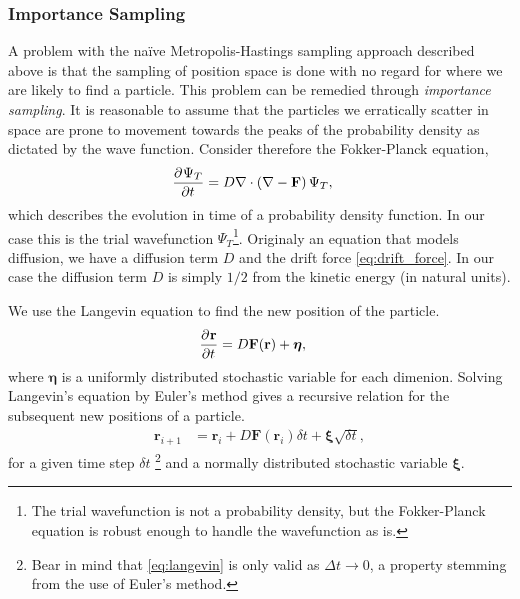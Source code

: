 \documentclass[
    a4paper, aps, twocolumn, floatfix, superscriptaddress,
    nofootinbib]{revtex4-1}
\newcommand{\vf}{\mathbf}
\newcommand{\vfg}{\boldsymbol}
\newcommand{\1}{\mathds{1}}
\begin{document}
        \subsubsection{Importance Sampling}
            A problem with the naïve Metropolis-Hastings sampling approach
            described above is that the sampling of position space is done with
            no regard for where we are likely to find a particle. This problem
            can be remedied through \emph{importance sampling}.  It is
            reasonable to assume that the particles we erratically scatter in
            space are prone to movement towards the peaks of the probability
            density as dictated by the wave function. Consider therefore the
            Fokker-Planck equation,
            \begin{align}
                \dpd[]{\Psi_T}{t}
                &=
                D \nabla\cdot
                \left(
                    \nabla
                    - \vf{F}
                \right) \Psi_T,
                \label{eq:fokker_planck}
            \end{align}
            which describes the evolution in time of a probability density
            function. In our case this is the trial wavefunction
            $\Psi_T$\footnote{The trial wavefunction is not a probability
            density, but the Fokker-Planck equation is robust enough to handle
            the wavefunction as is.}.  Originaly an equation that models
            diffusion, we have a diffusion term $D$ and the drift force
            \autoref{eq:drift_force}. In our case the diffusion term $D$ is
            simply $1/2$ from the kinetic energy (in natural units).

            We use the Langevin equation to find the new position of the
            particle.
            \begin{align}
                \dpd[]{\vf{r}}{t}
                &=
                D\vf{F}(\vf{r}) + \vfg{\eta},
                \label{eq:langevin}
            \end{align}
            where $\vfg{\eta}$ is a uniformly distributed stochastic variable
            for each dimenion.  Solving Langevin's equation by Euler's method
            gives a recursive relation for the subsequent new positions of a
            particle.
            \begin{align}
                \vf{r}_{i + 1}
                &=
                \vf{r}_i + D\vf{F}(\vf{r}_i)\delta t
                + \vfg{\xi}\sqrt{\delta t},
            \end{align}
            for a given time step $\delta t$
            \footnote{
                Bear in mind that \autoref{eq:langevin} is only valid as $\Delta
                t \to 0$, a property stemming from the use of Euler's method.
            }
            and a normally distributed stochastic variable $\vfg{\xi}$.
\end{document}
